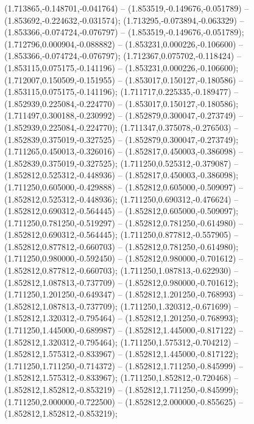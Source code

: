  (1.713865,-0.148701,-0.041764) -- (1.853519,-0.149676,-0.051789) -- (1.853692,-0.224632,-0.031574);
 (1.713295,-0.073894,-0.063329) -- (1.853366,-0.074724,-0.076797) -- (1.853519,-0.149676,-0.051789);
 (1.712796,0.000904,-0.088882) -- (1.853231,0.000226,-0.106600) -- (1.853366,-0.074724,-0.076797);
 (1.712367,0.075702,-0.118424) -- (1.853115,0.075175,-0.141196) -- (1.853231,0.000226,-0.106600);
 (1.712007,0.150509,-0.151955) -- (1.853017,0.150127,-0.180586) -- (1.853115,0.075175,-0.141196);
 (1.711717,0.225335,-0.189477) -- (1.852939,0.225084,-0.224770) -- (1.853017,0.150127,-0.180586);
 (1.711497,0.300188,-0.230992) -- (1.852879,0.300047,-0.273749) -- (1.852939,0.225084,-0.224770);
 (1.711347,0.375078,-0.276503) -- (1.852839,0.375019,-0.327525) -- (1.852879,0.300047,-0.273749);
 (1.711265,0.450013,-0.326016) -- (1.852817,0.450003,-0.386098) -- (1.852839,0.375019,-0.327525);
 (1.711250,0.525312,-0.379087) -- (1.852812,0.525312,-0.448936) -- (1.852817,0.450003,-0.386098);
 (1.711250,0.605000,-0.429888) -- (1.852812,0.605000,-0.509097) -- (1.852812,0.525312,-0.448936);
 (1.711250,0.690312,-0.476624) -- (1.852812,0.690312,-0.564445) -- (1.852812,0.605000,-0.509097);
 (1.711250,0.781250,-0.519297) -- (1.852812,0.781250,-0.614980) -- (1.852812,0.690312,-0.564445);
 (1.711250,0.877812,-0.557905) -- (1.852812,0.877812,-0.660703) -- (1.852812,0.781250,-0.614980);
 (1.711250,0.980000,-0.592450) -- (1.852812,0.980000,-0.701612) -- (1.852812,0.877812,-0.660703);
 (1.711250,1.087813,-0.622930) -- (1.852812,1.087813,-0.737709) -- (1.852812,0.980000,-0.701612);
 (1.711250,1.201250,-0.649347) -- (1.852812,1.201250,-0.768993) -- (1.852812,1.087813,-0.737709);
 (1.711250,1.320312,-0.671699) -- (1.852812,1.320312,-0.795464) -- (1.852812,1.201250,-0.768993);
 (1.711250,1.445000,-0.689987) -- (1.852812,1.445000,-0.817122) -- (1.852812,1.320312,-0.795464);
 (1.711250,1.575312,-0.704212) -- (1.852812,1.575312,-0.833967) -- (1.852812,1.445000,-0.817122);
 (1.711250,1.711250,-0.714372) -- (1.852812,1.711250,-0.845999) -- (1.852812,1.575312,-0.833967);
 (1.711250,1.852812,-0.720468) -- (1.852812,1.852812,-0.853219) -- (1.852812,1.711250,-0.845999);
 (1.711250,2.000000,-0.722500) -- (1.852812,2.000000,-0.855625) -- (1.852812,1.852812,-0.853219);
